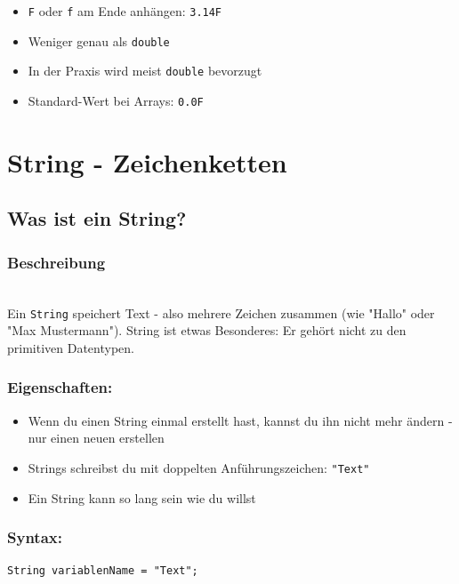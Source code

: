 \begin{achtung}
	\begin{itemize}
		\item \texttt{F} oder \texttt{f} am Ende anhängen: \texttt{3.14F}
		\item Weniger genau als \texttt{double}
		\item In der Praxis wird meist \texttt{double} bevorzugt
		\item Standard-Wert bei Arrays: \texttt{0.0F}
	\end{itemize}
\end{achtung}

\newpage


\section*{String - Zeichenketten}

\subsection*{Was ist ein String?}

\subsubsection*{Beschreibung}\\
Ein \texttt{String} speichert Text - also mehrere Zeichen zusammen (wie "Hallo" oder "Max Mustermann").
String ist etwas Besonderes: Er gehört nicht zu den primitiven Datentypen.

\subsubsection*{Eigenschaften:}
\begin{itemize}
	\item Wenn du einen String einmal erstellt hast, kannst du ihn nicht mehr ändern - nur einen neuen erstellen
	\item Strings schreibst du mit doppelten Anführungszeichen: \texttt{"Text"}
	\item Ein String kann so lang sein wie du willst
\end{itemize}

\subsubsection*{Syntax:}
\begin{lstlisting}
String variablenName = "Text";
\end{lstlisting}

